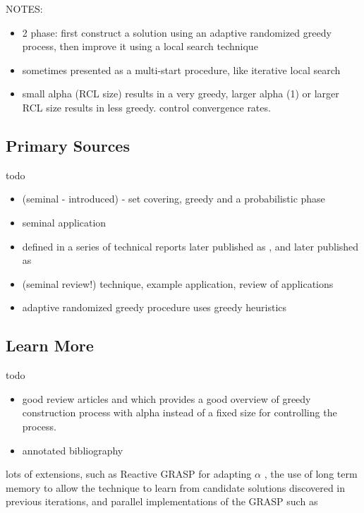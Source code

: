 \documentclass[a4paper, 11pt]{article}
\begin{document}
NOTES: 
\begin{itemize}
	\item 2 phase: first construct a solution using an adaptive randomized greedy process, then improve it using a local search technique
	\item sometimes presented as a multi-start procedure, like iterative local search
	\item small alpha (RCL size) results in a very greedy, larger alpha (1) or larger RCL size results in less greedy. control convergence rates.
\end{itemize}


% 
% 
\subsection{Primary Sources}
todo

\begin{itemize}
	\item (seminal - introduced) \cite{Feo1989} - set covering, greedy and a probabilistic phase
	\item seminal application \cite{Feo1991}
	\item defined in a series of technical reports \cite{Feo1993} later published as \cite{Bard1996}, and \cite{Feo1994} later published as \cite{Feo1996}
	\item (seminal review!) technique, example application, review of applications \cite{Feo1995}
	\item adaptive randomized greedy procedure uses greedy heuristics \cite{Hart1987}
\end{itemize}

% 
% 
\subsection{Learn More}
todo

\begin{itemize}

	\item good review articles \cite{Pitsoulis2002} and \cite{Resende2003} which provides a good overview of greedy construction process with alpha instead of a fixed size for controlling the process.
	\item annotated bibliography \cite{Festa2002}
\end{itemize}

lots of extensions, such as Reactive GRASP for adapting $\alpha$ \cite{Prais2000}, the use of long term memory to allow the technique to learn from candidate solutions discovered in previous iterations, and parallel implementations of the GRASP such as \cite{Pardalos1995} 
\end{document}
